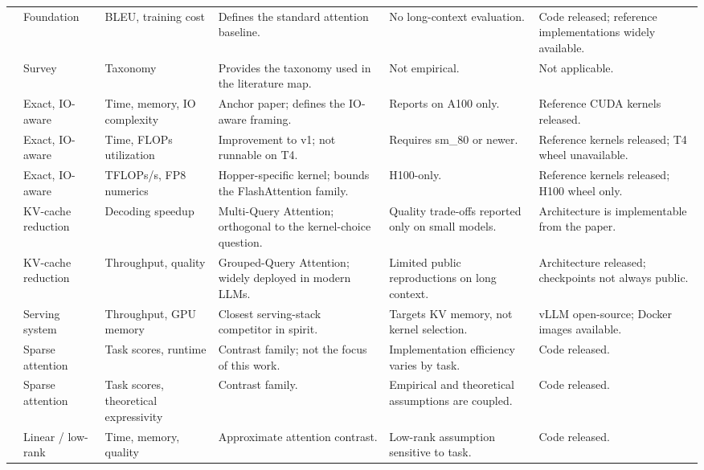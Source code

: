 \documentclass[11pt]{article}
\begin{document}
\begin{small}
\begin{longtable}{p{2.4cm} p{1.6cm} p{1.6cm} p{2.5cm} p{2.2cm} p{2.5cm}}
\cite{vaswani2023attentionneed} & Foundation & BLEU, training cost & Defines the standard attention baseline. & No long-context evaluation. & Code released; reference implementations widely available. \\
\cite{10.1145/3530811} & Survey & Taxonomy & Provides the taxonomy used in the literature map. & Not empirical. & Not applicable. \\
\cite{dao2022flashattentionfastmemoryefficientexact} & Exact, IO-aware & Time, memory, IO complexity & Anchor paper; defines the IO-aware framing. & Reports on A100 only. & Reference CUDA kernels released. \\
\cite{dao2023flashattention2fasterattentionbetter} & Exact, IO-aware & Time, FLOPs utilization & Improvement to v1; not runnable on T4. & Requires sm\_80 or newer. & Reference kernels released; T4 wheel unavailable. \\
\cite{shah2024flashattention3fastaccurateattention} & Exact, IO-aware & TFLOPs/s, FP8 numerics & Hopper-specific kernel; bounds the FlashAttention family. & H100-only. & Reference kernels released; H100 wheel only. \\
\cite{shazeer2019fasttransformerdecodingwritehead} & KV-cache reduction & Decoding speedup & Multi-Query Attention; orthogonal to the kernel-choice question. & Quality trade-offs reported only on small models. & Architecture is implementable from the paper. \\
\cite{ainslie2023gqatraininggeneralizedmultiquery} & KV-cache reduction & Throughput, quality & Grouped-Query Attention; widely deployed in modern LLMs. & Limited public reproductions on long context. & Architecture released; checkpoints not always public. \\
\cite{kwon2023efficientmemorymanagementlarge} & Serving system & Throughput, GPU memory & Closest serving-stack competitor in spirit. & Targets KV memory, not kernel selection. & vLLM open-source; Docker images available. \\
\cite{beltagy2020longformerlongdocumenttransformer} & Sparse attention & Task scores, runtime & Contrast family; not the focus of this work. & Implementation efficiency varies by task. & Code released. \\
\cite{zaheer2021bigbirdtransformerslonger} & Sparse attention & Task scores, theoretical expressivity & Contrast family. & Empirical and theoretical assumptions are coupled. & Code released. \\
\cite{wang2020linformerselfattentionlinearcomplexity} & Linear / low-rank & Time, memory, quality & Approximate attention contrast. & Low-rank assumption sensitive to task. & Code released. \\

\end{longtable}
\end{small}
\end{document}
